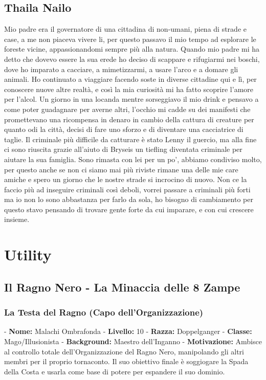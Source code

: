 \documentclass{article}
\begin{document}
          \subsection{Thaila Nailo}
          Mio padre era il governatore di una cittadina di non-umani, piena di strade e case, a me non piaceva vivere li, per questo passavo il mio tempo ad esplorare le foreste vicine, appassionandomi sempre più alla natura. Quando mio padre mi ha detto che dovevo essere la sua erede ho deciso di scappare e rifugiarmi nei boschi, dove ho imparato a cacciare, a mimetizzarmi, a usare l’arco e a domare gli animali. Ho continuato a viaggiare facendo soste in diverse cittadine qui e lì, per conoscere nuove altre realtà, e così la mia curiosità mi ha fatto scoprire l’amore per l’alcol. Un giorno in una locanda mentre sorseggiavo il mio drink e pensavo a come poter guadagnare per averne altri, l’occhio mi cadde su dei manifesti che promettevano una ricompensa in denaro in cambio della cattura di creature per quanto odi la città, decisi di fare uno sforzo e di diventare una cacciatrice di taglie. Il criminale più difficile da catturare è stato Lenny il guercio, ma alla fine ci sono riuscita grazie all’aiuto di Bryseis un tiefling diventata criminale per aiutare la sua famiglia. Sono rimasta con lei per un po’, abbiamo condiviso molto, per questo anche se non ci siamo mai più riviste rimane una delle mie care amiche e spero un giorno che le nostre strade si incrocino di nuovo. Non ce la faccio più ad inseguire criminali così deboli, vorrei passare a criminali più forti ma io non lo sono abbastanza per farlo da sola, ho bisogno di cambiamento per questo stavo pensando di trovare gente forte da cui imparare, e con cui crescere insieme. 



          \section{Utility}


          \subsection{Il Ragno Nero - La Minaccia delle 8 Zampe}

              \subsubsection{ La Testa del Ragno (Capo dell'Organizzazione)}
   - \textbf{Nome:} Malachi Ombrafonda
   - \textbf{Livello:} 10
   - \textbf{Razza:} Doppelganger
   - \textbf{Classe:} Mago/Illusionista
   - \textbf{Background:} Maestro dell'Inganno
   - \textbf{Motivazione:} Ambisce al controllo totale dell'Organizzazione del Ragno Nero, manipolando gli altri membri per il proprio tornaconto. Il suo obiettivo finale è soggiogare la Spada della Costa e usarla come base di potere per espandere il suo dominio.
\end{document}
